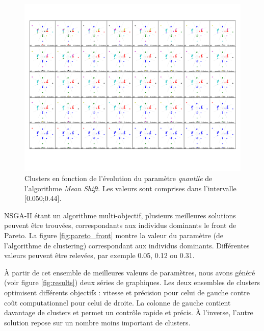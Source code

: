 \documentclass[draft]{llncs}
\begin{document}
\begin{figure}[ht]
  \begin{center}
  \includegraphics[width=\textwidth]{figures/DS2_MS.pdf}
    \caption{Clusters en fonction de l'évolution du paramètre \textit{quantile} de l'algorithme \textit{Mean Shift}. Les valeurs sont comprises dans l'intervalle [0.050;0.44].}
  \label{fig:validation}
  \end{center}
\end{figure}

NSGA-II étant un algorithme multi-objectif, plusieurs meilleures solutions peuvent être trouvées, correspondants aux individus dominants le front de Pareto.
La figure \ref{fig:pareto_front} montre la valeur du paramètre (de l'algorithme de clustering) correspondant aux individus dominants.
Différentes valeurs peuvent être relevées, par exemple 0.05, 0.12 ou 0.31.

À partir de cet ensemble de meilleures valeurs de paramètres, nous avons généré (voir figure \ref{fig:results}) deux séries de graphiques.
Les deux ensembles de clusters optimisent différents objectifs : vitesse et précision pour celui de gauche contre coût computationnel pour celui de droite.
La colonne de gauche contient davantage de clusters et permet un contrôle rapide et précis.
À l'inverse, l'autre solution repose sur un nombre moins important de clusters.
\end{document}
